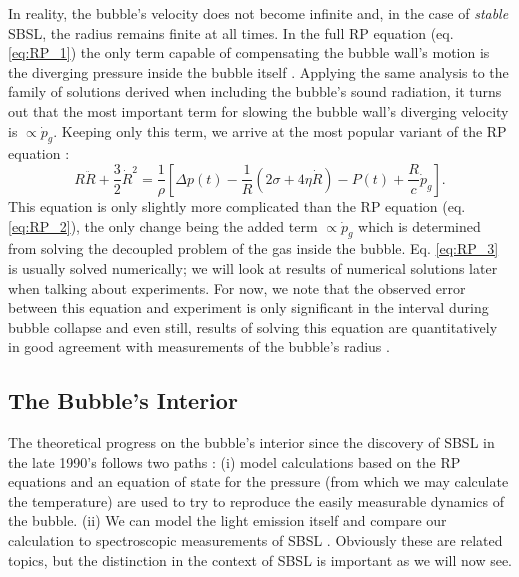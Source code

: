 \documentclass[rmp,aps,nofootinbib,superscriptaddress,floatfix]{revtex4-2}
\begin{document}
In reality, the bubble's velocity does not become infinite and, in the case of \emph{stable} SBSL, the radius remains finite at all times. In the full RP equation (eq. \ref{eq:RP_1}) the only term capable of compensating the bubble wall's motion is the diverging pressure inside the bubble itself \cite{brenner2002single}. Applying the same analysis to the family of solutions derived when including the bubble's sound radiation, it turns out that the most important term for slowing the bubble wall's diverging velocity is $\propto\dot{p}_g$. Keeping only this term, we arrive at the most popular variant of the RP equation \cite{lofstedt1995sonoluminescing,barber1997defining}:
\begin{equation}
    R\ddot{R}+\frac{3}{2}\dot{R}^2 = \frac{1}{\rho} \left[ \Delta p(t)-\frac{1}{R}\left( 2\sigma+4\eta \dot{R} \right)-P(t) +\frac{R}{c} \dot{p}_g \right].
    \label{eq:RP_3}
\end{equation}
This equation is only slightly more complicated than the RP equation (eq. \ref{eq:RP_2}), the only change being the added term $\propto \dot{p}_g$ which is determined from solving the decoupled problem of the gas inside the bubble. Eq. \ref{eq:RP_3} is usually solved numerically; we will look at results of numerical solutions later when talking about experiments. For now, we note that the observed error between this equation and experiment is only significant in the interval during bubble collapse and even still, results of solving this equation are quantitatively in good agreement with measurements of the bubble's radius \cite{brenner2002single}. 


\subsection{The Bubble's Interior}
The theoretical progress on the bubble's interior since the discovery of SBSL in the late 1990's \cite{gaitan1992sonoluminescence} follows two paths \cite{brenner2002single,suslick2008inside,yasui2018acoustic}: (i) model calculations based on the RP equations and an equation of state for the pressure (from which we may calculate the temperature) are used to try to reproduce the easily measurable dynamics of the bubble. (ii) We can model the light emission itself and compare our calculation to spectroscopic measurements of SBSL \cite{}. Obviously these are related topics, but the distinction in the context of SBSL is important as we will now see.
\end{document}
